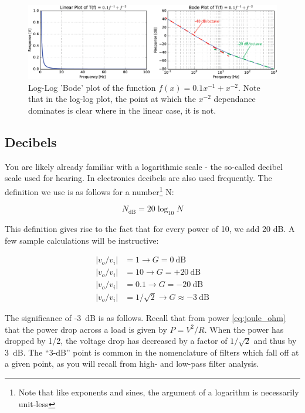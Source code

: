 \documentclass{tufte-book}
\begin{document}
\begin{figure}[h]
\caption{Log-Log 'Bode' plot of the function $f(x) = 0.1x^{-1}+x^{-2}$. Note that in the log-log plot, the point at which the $x^{-2}$ dependance dominates is clear where in the linear case, it is not.}
\label{ fig:BodePowers}
\begin{center}
\includegraphics[width=\textwidth]{BodePowers.png}
\end{center}
\end{figure}


\subsection{Decibels}
You are likely already familiar with a logarithmic scale - the so-called decibel scale used for hearing. In electronics decibels are also used frequently. The definition we use is as follows for a number\footnote{Note that like exponents and sines, the argument of a logarithm is necessarily unit-less} N:

$$
N_\text{dB} = 20\log_{10}N
$$

This definition gives rise to the fact that for every power of 10, we add 20 dB. A few sample calculations will be instructive:


\begin{align*}
|v_o/v_i| &= 1 \rightarrow G=0~\text{dB} \\
|v_o/v_i| &= 10  \rightarrow G=+20~\text{dB} \\
|v_o/v_i| &=0.1 \rightarrow G=-20~\text{dB}\\
|v_o/v_i| &= 1/\sqrt{2} \rightarrow G\approx -3~\text{dB}
\end{align*}

The significance of -3~dB is as follows. Recall that from power \ref{eq:joule_ohm} that the power drop across a load is given by $P = V^2/R$. When the power has dropped by 1/2, the voltage drop has decreased by a factor of $1/\sqrt{2}$ and thus by 3~dB. The ``3-dB'' point is common in the nomenclature of filters which fall off at a given point, as you will recall from high- and low-pass filter analysis.
\end{document}

